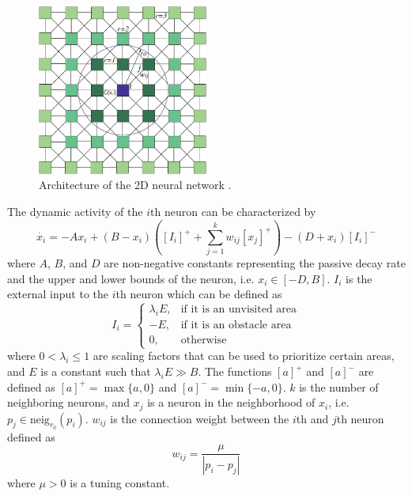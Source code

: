 \begin{figure}[h!]
	\centering
	\includegraphics[width=0.5\textwidth]{fig/ccpp/nn_architecture2}
	\caption[Architecture of the 2D neural network.]{Architecture of the 2D neural network \citep{luo2008bioinspired}.}
	\label{fig:arch_nn}
\end{figure}

The dynamic activity of the $i$th neuron can be characterized by \citep{yang2004neural}
\begin{equation} \label{eq:binn}
\dot{x_i} = -A x_i + (B - x_i)\left([I_i]^{+} + \sum^k_{j=1}w_{ij}[x_j]^{+} \right) - (D+x_i)[I_i]^{-}
\end{equation}
where $A$, $B$, and $D$ are non-negative constants representing the passive decay rate and the upper and lower bounds of the neuron, i.e. $x_i \in [-D, B]$. $I_i$ is the external input to the $i$th neuron which can be defined as \citep{Scibilia2012}
\begin{equation}
I_i = 
\begin{cases}
\lambda_i E, & \text{if it is an unvisited area} \\
-E, & \text{if it is an obstacle area} \\
0, & \text{otherwise}
\end{cases}
\end{equation}
where $0 < \lambda_i \leq 1$ are scaling factors that can be used to prioritize certain areas, and $E$ is a constant such that $\lambda_i E \gg B$. The functions $[a]^{+}$ and $[a]^{-}$ are defined as $[a]^{+} = \max\{a,0\}$ and $[a]^{-} = \min\{-a,0\}$. $k$ is the number of neighboring neurons, and $x_j$ is a neuron in the neighborhood of $x_i$, i.e. $p_j \in \text{neig}_{r_0}(p_i)$. $w_{ij}$ is the connection weight between the $i$th and $j$th neuron defined as 
\begin{equation}
w_{ij} = \frac{\mu}{|p_i-p_j|}
\end{equation}
where $\mu > 0$ is a tuning constant. 

